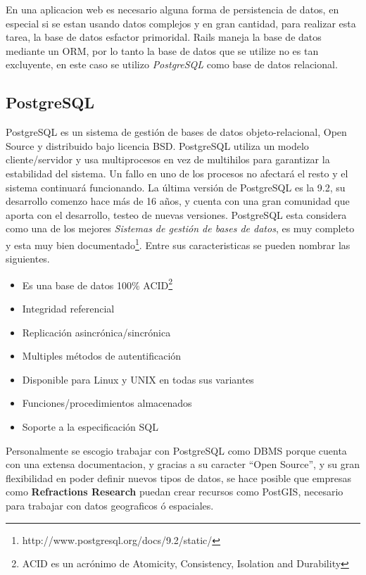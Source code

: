    En una aplicacion web es necesario alguna forma de persistencia de datos, en especial si se estan usando datos complejos y en gran cantidad, para realizar esta tarea, la base de datos esfactor primoridal.
    Rails maneja la base de datos mediante  un ORM, por lo tanto la base de datos que se utilize no es tan excluyente, en este caso se utilizo  \emph{PostgreSQL} como base de datos relacional.\\

    \subsection{PostgreSQL} %
    \label{sec:postgres}

      PostgreSQL es un sistema de gestión de bases de datos objeto-relacional, Open Source y distribuido bajo licencia BSD. 
      PostgreSQL utiliza un modelo cliente/servidor y usa multiprocesos en vez de multihilos para garantizar la estabilidad del sistema. Un fallo en uno de los procesos no afectará el resto y el sistema continuará funcionando.
      La última versi\'on de PostgreSQL es la 9.2, su desarrollo comenzo hace más de 16 años, y cuenta con una gran comunidad que aporta con el desarrollo, testeo de nuevas versiones.
      PostgreSQL  esta considera como una de los mejores \emph{Sistemas de gesti\'on de bases de datos}, es muy completo y esta muy bien documentado\footnote{ http://www.postgresql.org/docs/9.2/static/}. 
      Entre sus caracteristicas se pueden nombrar las siguientes.
      \begin{itemize}
        \item Es una base de datos 100\% ACID\footnote{  ACID es un acrónimo de Atomicity, Consistency, Isolation and Durability}
        \item Integridad referencial
        \item Replicación asincrónica/sincrónica
        \item Multiples métodos de autentificación
        \item Disponible para Linux y UNIX en todas sus variantes
        \item Funciones/procedimientos almacenados
        \item Soporte a la especificaci\'on SQL
      \end{itemize}

      Personalmente se escogio trabajar con  PostgreSQL como DBMS
      porque cuenta con una extensa documentacion,  y gracias a su caracter ``Open Source'', y su gran flexibilidad en poder definir nuevos tipos de datos, 
      se hace posible que empresas como \textbf{Refractions Research} puedan crear recursos como PostGIS, necesario para trabajar con datos geograficos \'o espaciales.


